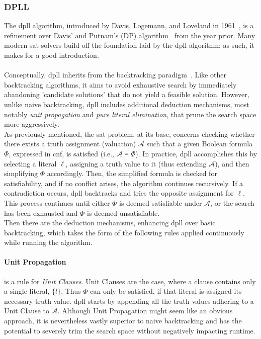 \subsubsection{DPLL}
The \acrshort{dpll} algorithm, introduced by Davis, Logemann, and Loveland in 1961~\cite{Original-DPLL-Article}, is a refinement over Davis' and Putnam's (DP) algorithm~\cite{Original-DP-Article} from the year prior. Many modern \acrshort{sat} solvers build off the foundation laid by the \acrshort{dpll} algorithm; as such, it makes for a good introduction.
\\
\\
Conceptually, \acrshort{dpll} inherits from the backtracking paradigm~\cite{Wiki-backtracking}. Like other backtracking algorithms, it aims to avoid exhaustive search by immediately abandoning  'candidate solutions' that do not yield a feasible solution. However, unlike naive backtracking, \acrshort{dpll} includes additional deduction mechanisms, most notably \emph{unit propagation} and \emph{pure literal elimination}, that prune the search space more aggressively.
\\
As previously mentioned, the \acrshort{sat} problem, at its base, concerns checking whether there exists a truth assignment (valuation) \(\mathcal{A}\) such that a given Boolean formula \(\Phi\), expressed in \acrshort{cnf}, is satisfied (i.e., \(\mathcal{A} \models \Phi\)). In practice, \acrshort{dpll} accomplishes this by selecting a literal \(\ell\), assigning a truth value to it (thus extending \(\mathcal{A}\)), and then simplifying \(\Phi\) accordingly. Then, the simplified formula is checked for satisfiability, and if no conflict arises, the algorithm continues recursively. If a contradiction occurs, \acrshort{dpll} backtracks and tries the opposite assignment for \(\ell\). This process continues until either \(\Phi\) is deemed satisfiable under \(\mathcal{A}\), or the search has been exhausted and \(\Phi\) is deemed unsatisfiable.
\\
Then there are the deduction mechanisms, enhancing \acrshort{dpll} over basic backtracking, which takes the form of the following rules applied continuously while running the algorithm.

\paragraph{Unit Propagation} is a rule for \emph{Unit Clauses}. Unit Clauses are the case, where a clause contains only a single literal, \(\{l\}\). Thus \(\Phi\) can only be satisfied, if that literal is assigned its necessary truth value. \acrshort{dpll} starts by appending all the truth values adhering to a Unit Clause to \(\mathcal{A}\). Although Unit Propagation might seem like an obvious approach, it is nevertheless vastly superior to naive backtracking and has the potential to severely trim the search space without negatively impacting runtime.


